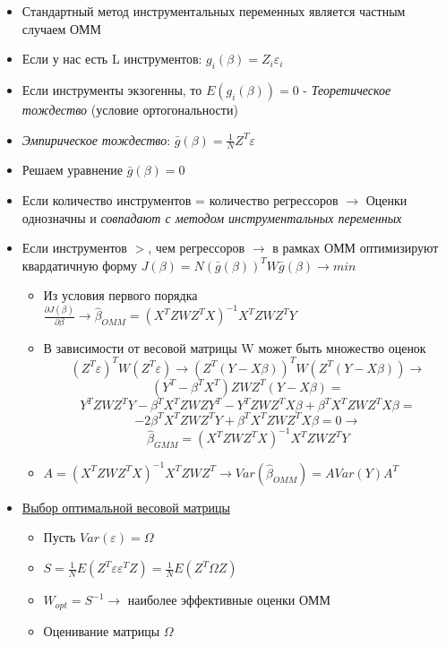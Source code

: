 \documentclass[a4paper, 12pt]{article}
\begin{document}
\begin{itemize}
    \item Стандартный метод инструментальных переменных является частным случаем ОММ
    \item Если у нас есть L инструментов:
    $g_{i}(\beta) = Z_{i}\varepsilon_{i}$
    \item Если инструменты экзогенны, то $E(g_{i}(\beta)) = 0$ - \textit{Теоретическое тождество} (условие ортогональности)
    \item \textit{Эмпирическое тождество}: $\bar{g}(\beta) = \frac{1}{N}Z^{T}\varepsilon$
    \item Решаем уравнение $\bar{g}(\beta) = 0$
    \item Если количество инструментов = количество регрессоров $\rightarrow$ Оценки однозначны и \textit{совпадают с методом инструментальных переменных}
    \item Если инструментов $>$, чем регрессоров $\rightarrow$ в рамках ОММ оптимизируют квардатичную форму $J(\beta) = N(\bar{g}(\beta))^{T}W\bar{g}(\beta) \rightarrow min$
    \begin{itemize}
        \item Из условия первого порядка $\frac{\partial J(\beta)}{\partial \beta} \rightarrow \hat{\beta}_{OMM} = (X^{T}ZWZ^{T}X)^{-1}X^{T}ZWZ^{T}Y$
        \item В зависимости от весовой матрицы W может быть множество оценок
        \[(Z^{T}\varepsilon)^{T}W(Z^{T}\varepsilon) \rightarrow (Z^{T}(Y - X\beta))^{T}W(Z^{T}(Y - X\beta)) \rightarrow \]
        \[(Y^{T} - \beta^{T}X^{T})ZWZ^{T}(Y - X\beta) =\] \[Y^{T}ZWZ^{T}Y - \beta^{T}X^{T}ZWZY^{T} - Y^{T}ZWZ^{T}X\beta + \beta^{T}X^{T}ZWZ^{T}X\beta =\] \[-2\beta^{T}X^{T}ZWZ^{T}Y + \beta^{T}X^{T}ZWZ^{T}X\beta = 0 \rightarrow\]
        \[\hat{\beta}_{GMM} = (X^{T}ZWZ^{T}X)^{-1}X^{T}ZWZ^{T}Y\]
        \item $A = (X^{T}ZWZ^{T}X)^{-1}X^{T}ZWZ^{T} \rightarrow Var(\hat{\beta}_{OMM}) = AVar(Y)A^{T}$
    \end{itemize}
    \item \underline{Выбор оптимальной весовой матрицы}
    \begin{itemize}
        \item Пусть $Var(\varepsilon) = \Omega$
        \item $S = \frac{1}{N}E(Z^{T}\varepsilon\varepsilon^{T}Z) = \frac{1}{N}E(Z^{T}\Omega Z)$
        \item $W_{opt} = S^{-1} \rightarrow$ наиболее эффективные оценки ОММ
        \item Оценивание матрицы $\Omega$

\end{itemize}
\end{itemize}
\end{document}
